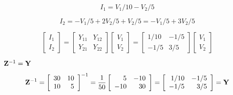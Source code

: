 {\newpage\clearpage
{}%
\begin{displaymath}	I_1=V_1/10-V_2/5	\end{displaymath}%
\lthtmldisplayZ
\lthtmlcheckvsize\clearpage}

{\newpage\clearpage
{}%
\begin{displaymath}	I_2=-V_1/5+2V_2/5+V_2/5=-V_1/5+3V_2/5	\end{displaymath}%
\lthtmldisplayZ
\lthtmlcheckvsize\clearpage}

{\newpage\clearpage
{}%
\begin{displaymath}	\left[ \begin{array}{l} I_1 \\I_2 \end{array} \right]=
	\left[ \begin{array}{rr} Y_{11} & Y_{12} \\Y_{21} & Y_{22} \end{array} \right]
	\left[ \begin{array}{l} V_1 \\V_2 \end{array} \right]
=	\left[ \begin{array}{rr} 1/10 & -1/5 \\-1/5 & 3/5 \end{array} \right]
	\left[ \begin{array}{l} V_1 \\V_2 \end{array} \right] \end{displaymath}%
\lthtmldisplayZ
\lthtmlcheckvsize\clearpage}

{\newpage\clearpage
{}%
${\bf Z}^{-1}={\bf Y}$%
\lthtmlinlinemathZ
\lthtmlcheckvsize\clearpage}

{\newpage\clearpage
{}%
\begin{displaymath} {\bf Z}^{-1}=\left[ \begin{array}{rr} 30 & 10 \\10 & 5 \end{array} \right]^{-1}
	=\frac{1}{50}\left[ \begin{array}{rr} 5 & -10 \\-10 & 30 \end{array} \right]
	=\left[ \begin{array}{rr} 1/10 & -1/5 \\-1/5 & 3/5 \end{array} \right]
	={\bf Y}	\end{displaymath}%
\lthtmldisplayZ
\lthtmlcheckvsize\clearpage}

